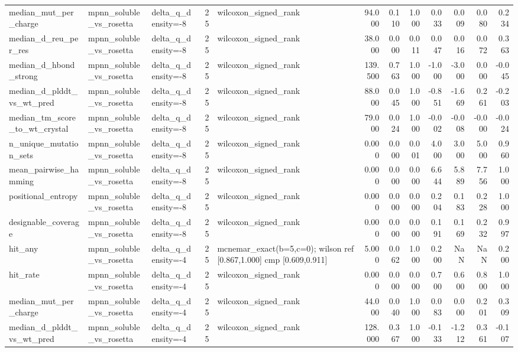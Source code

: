 \begin{table}
{\begin{tabular}{lllrlrrrrrrr}
median\_mut\_per\_charge & mpnn\_soluble\_vs\_rosetta & delta\_q\_density=-8 & 25 & wilcoxon\_signed\_rank & 94.000 & 0.110 & 1.000 & 0.033 & 0.009 & 0.080 & 0.234 \\
median\_d\_reu\_per\_res & mpnn\_soluble\_vs\_rosetta & delta\_q\_density=-8 & 25 & wilcoxon\_signed\_rank & 38.000 & 0.000 & 0.011 & 0.047 & 0.016 & 0.072 & 0.363 \\
median\_d\_hbond\_strong & mpnn\_soluble\_vs\_rosetta & delta\_q\_density=-8 & 25 & wilcoxon\_signed\_rank & 139.500 & 0.763 & 1.000 & -1.000 & -3.000 & 0.000 & -0.045 \\
median\_d\_plddt\_vs\_wt\_pred & mpnn\_soluble\_vs\_rosetta & delta\_q\_density=-8 & 25 & wilcoxon\_signed\_rank & 88.000 & 0.045 & 1.000 & -0.851 & -1.669 & 0.261 & -0.203 \\
median\_tm\_score\_to\_wt\_crystal & mpnn\_soluble\_vs\_rosetta & delta\_q\_density=-8 & 25 & wilcoxon\_signed\_rank & 79.000 & 0.024 & 1.000 & -0.002 & -0.008 & -0.000 & -0.024 \\
n\_unique\_mutation\_sets & mpnn\_soluble\_vs\_rosetta & delta\_q\_density=-8 & 25 & wilcoxon\_signed\_rank & 0.000 & 0.000 & 0.001 & 4.000 & 3.000 & 5.000 & 0.960 \\
mean\_pairwise\_hamming & mpnn\_soluble\_vs\_rosetta & delta\_q\_density=-8 & 25 & wilcoxon\_signed\_rank & 0.000 & 0.000 & 0.000 & 6.644 & 5.889 & 7.756 & 1.000 \\
positional\_entropy & mpnn\_soluble\_vs\_rosetta & delta\_q\_density=-8 & 25 & wilcoxon\_signed\_rank & 0.000 & 0.000 & 0.000 & 0.204 & 0.183 & 0.228 & 1.000 \\
designable\_coverage & mpnn\_soluble\_vs\_rosetta & delta\_q\_density=-8 & 25 & wilcoxon\_signed\_rank & 0.000 & 0.000 & 0.000 & 0.191 & 0.169 & 0.232 & 0.997 \\
hit\_any & mpnn\_soluble\_vs\_rosetta & delta\_q\_density=-4 & 25 & mcnemar\_exact(b=5,c=0); wilson ref [0.867,1.000] cmp [0.609,0.911] & 5.000 & 0.062 & 1.000 & 0.200 & NaN & NaN & 0.200 \\
hit\_rate & mpnn\_soluble\_vs\_rosetta & delta\_q\_density=-4 & 25 & wilcoxon\_signed\_rank & 0.000 & 0.000 & 0.000 & 0.700 & 0.600 & 0.800 & 1.000 \\
median\_mut\_per\_charge & mpnn\_soluble\_vs\_rosetta & delta\_q\_density=-4 & 25 & wilcoxon\_signed\_rank & 44.000 & 0.040 & 1.000 & 0.083 & 0.000 & 0.201 & 0.309 \\
median\_d\_plddt\_vs\_wt\_pred & mpnn\_soluble\_vs\_rosetta & delta\_q\_density=-4 & 25 & wilcoxon\_signed\_rank & 128.000 & 0.367 & 1.000 & -0.133 & -1.212 & 0.361 & -0.107 \\

\end{tabular}}
\end{table}

